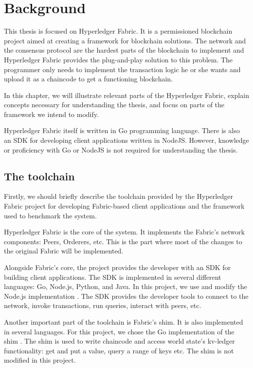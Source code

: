 \chapter{Background}
\label{chapter:background}

This thesis is focused on Hyperledger Fabric. It is a permissioned blockchain project aimed at creating a framework for blockchain solutions\cite{lit:HF:ADOSPB}. The network and the consensus protocol are the hardest parts of the blockchain to implement and Hyperledger Fabric provides the plug-and-play solution to this problem. The programmer only needs to implement the transaction logic he or she wants and upload it as a chaincode to get a functioning blockchain.

In this chapter, we will illustrate relevant parts of the Hyperledger Fabric, explain concepts necessary for understanding the thesis, and focus on parts of the framework we intend to modify.

Hyperledger Fabric itself is written in Go programming language. There is also an SDK for developing client applications written in NodeJS.
However, knowledge or proficiency with Go or NodeJS is not required for understanding the thesis.

\section{The toolchain}\label{sec:back-tools}

Firstly, we should briefly describe the toolchain provided by the Hyperledger Fabric project for developing Fabric-based client applications and the framework used to benchmark the system.

Hyperledger Fabric is the core of the system. It implements the Fabric's network components: Peers, Orderers, etc.  This is the part where most of the changes to the original Fabric will be implemented.

Alongside Fabric's core, the project provides the developer with an SDK for building client applications. The SDK is implemented in several different languages: Go, Node.js, Python, and Java. In this project, we use and modify the Node.js implementation \cite{lit:fabric-sdk-node}. The SDK provides the developer tools to connect to the network, invoke transactions, run queries, interact with peers, etc.

Another important part of the toolchain is Fabric's shim. It is also implemented in several languages. For this project, we chose the Go implementation of the shim \cite{lit:fabric-shim-go}. The shim is used to write chaincode and access world state's kv-ledger functionality: get and put a value, query a range of keys etc. The shim is not modified in this project.

